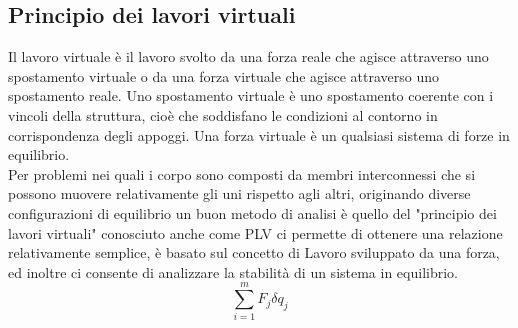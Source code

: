 \subsection{Principio dei lavori virtuali}
Il lavoro virtuale è il lavoro svolto da una forza reale che agisce attraverso uno spostamento virtuale o da una forza virtuale che agisce attraverso uno spostamento reale.
Uno spostamento virtuale è uno spostamento coerente con i vincoli della struttura, cioè che soddisfano le condizioni al contorno in corrispondenza degli appoggi.
Una forza virtuale è un qualsiasi sistema di forze in equilibrio.
\\Per problemi nei quali i corpo sono composti da membri interconnessi che si possono muovere relativamente gli uni rispetto agli altri, originando diverse configurazioni di equilibrio un buon metodo di analisi è quello del "principio dei lavori virtuali" conosciuto anche come PLV ci permette di ottenere una relazione relativamente semplice, è basato sul concetto di Lavoro sviluppato da una forza, ed inoltre ci consente di analizzare la stabilità di un sistema in equilibrio.
\begin{equation}
    \sum_{i=1}^m F_j\delta q_j\label{eq:din}
\end{equation}

